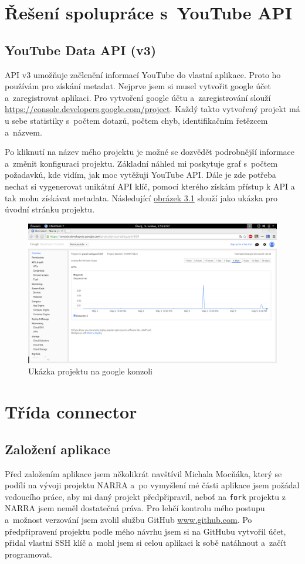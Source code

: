 \section{Řešení spolupráce s~YouTube API}
\subsection{YouTube Data API (v3)}
\par API v3\cite{apiv3} umožňuje začlenění informací YouTube do vlastní aplikace. Proto ho používám pro získání metadat. Nejprve jsem si musel vytvořit google účet a~zaregistrovat aplikaci. Pro vytvoření google účtu a~zaregistrování slouží \url{https://console.developers.google.com/project}\cite{googleconsole}. Každý takto vytvořený projekt má u sebe statistiky s~počtem dotazů, počtem chyb, identifikačním řetězcem a~názvem. 
\par Po kliknutí na název mého projektu je možné se dozvědět podrobnější informace a~změnit konfiguraci projektu. Základní náhled mi poskytuje graf s~počtem požadavků, kde vidím, jak moc vytěžuji YouTube API\cite{apiv3}. Dále je zde potřeba nechat si vygenerovat unikátní API klíč, pomocí kterého získám přístup k API a tak mohu získávat metadata. Následující \hyperlink{consolesample}{obrázek 3.1} slouží jako ukázka pro úvodní stránku projektu.
\begin{figure}[h]
	\hypertarget{consolesample}{}
	\centering
	\includegraphics[width=\textwidth]{obrazova_priloha/my_projekt.png}
	\caption{Ukázka projektu na google konzoli}
\end{figure}

\section{Třída connector}
\subsection{Založení aplikace}
\par Před založením aplikace jsem několikrát navštívil Michala Mocňáka, který se podílí na vývoji projektu NARRA a~po vymyšlení mé části aplikace jsem požádal vedoucího práce, aby mi daný projekt předpřipravil, neboť na \texttt{fork} projektu z NARRA jsem neměl dostatečná práva. Pro lehčí kontrolu mého postupu a~možnost verzování jsem zvolil službu GitHub \url{www.github.com}\cite{git}. Po předpřipravení projektu podle mého návrhu jsem si na GitHubu vytvořil účet, přidal vlastní SSH klíč a~mohl jsem si celou aplikaci k sobě natáhnout a~začít programovat.


